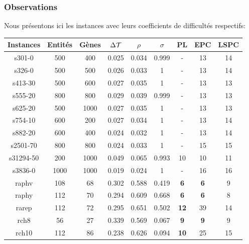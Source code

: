 
\subsubsection{Observations}

Nous présentons ici les instances avec leurs coefficients de difficultés respectifs:
\begin{center}
\begin{tabular}{|c|c|c|c|c|c|c|c|c|}
\hline 
Instances & Entités & Gènes & $\Delta\cal{T}$ & $\rho$ & $\sigma$ & PL & EPC & LSPC \\ 
\hline 
s301-0 & 500 & 400 & 0.025 & 0.034 & 0.999 & - & 13 & 14 \\ 
\hline 
s326-0 & 500 & 500 & 0.026 & 0.033 & 1 & - & 13 & 14 \\ 
\hline 
s413-30 & 500 & 600 & 0.027 & 0.035 & 1 & - & 13 & 13 \\ 
\hline 
s555-20 & 800 & 800 & 0.029 & 0.039 & 0.999 & - & 13 & 13 \\ 
\hline 
s625-20 & 500 & 1000 & 0.027 & 0.035 & 1 & - & 13 & 13 \\ 
\hline 
s754-10 & 600 & 200 & 0.027 & 0.034 & 1 & - & 13 & 14 \\ 
\hline 
s882-20 & 600 & 400 & 0.024 & 0.032 & 1 & - & 13 & 14 \\ 
\hline 
s2501-70 & 800 & 800 & 0.024 & 0.033 & 1 & - & 15 & 15 \\ 
\hline 
s31294-50 & 200 & 1000 & 0.049 & 0.065 & 0.993 & 10 & 10 & 11 \\ 
\hline 
s3836-0 & 1000 & 1000 & 0.019 & 0.024 & 1 & - & 16 & 16 \\ 
\hline 
raphv & 108 & 68 & 0.302 & 0.588 & 0.419 & \textbf{6} & \textbf{6} & 9 \\ 
\hline 
raphy & 112 & 70 & 0.294 & 0.609 & 0.668 & \textbf{6} & \textbf{6} & 8 \\ 
\hline 
rarep & 112 & 72 & 0.295 & 0.651 & 0.502 & \textbf{12} & 39 & 14 \\ 
\hline 
rch8 & 56 & 27 & 0.339 & 0.569 & 0.067 & \textbf{9} & \textbf{9} & 9 \\ 
\hline 
rch10 & 112 & 86 & 0.238 & 0.626 & 0.094 & \textbf{10} & 25 & 15 \\ 
\hline 
\end{tabular} 
\end{center}

